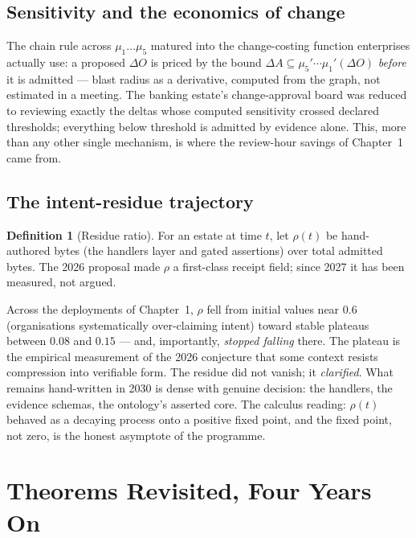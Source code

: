 \documentclass[11pt,a4paper]{report}
\theoremstyle{definition}
\newtheorem{definition}[theorem]{Definition}
\theoremstyle{remark}
\newcommand{\mymu}{\mu}
\newcommand{\del}{\Delta}
\begin{document}
\section{Sensitivity and the economics of change}

The chain rule across $\mymu_1 \dots \mymu_5$ matured into the
change-costing function enterprises actually use: a proposed
$\del O$ is priced by the bound
$\del A \subseteq \mymu_5' \cdots \mymu_1'(\del O)$ \emph{before} it is
admitted --- blast radius as a derivative, computed from the graph, not
estimated in a meeting. The banking estate's change-approval board was
reduced to reviewing exactly the deltas whose computed sensitivity crossed
declared thresholds; everything below threshold is admitted by evidence
alone. This, more than any other single mechanism, is where the review-hour
savings of Chapter~1 came from.

\section{The intent-residue trajectory}

\begin{definition}[Residue ratio]
For an estate at time $t$, let $\rho(t)$ be hand-authored bytes (the
handlers layer and gated assertions) over total admitted bytes. The 2026
proposal made $\rho$ a first-class receipt field; since 2027 it has been
measured, not argued.
\end{definition}

Across the deployments of Chapter~1, $\rho$ fell from initial values near
$0.6$ (organisations systematically over-claiming intent) toward stable
plateaus between $0.08$ and $0.15$ --- and, importantly, \emph{stopped
falling} there. The plateau is the empirical measurement of the 2026
conjecture that some context resists compression into verifiable form.
The residue did not vanish; it \emph{clarified}. What remains hand-written
in 2030 is dense with genuine decision: the handlers, the evidence schemas,
the ontology's asserted core. The calculus reading: $\rho(t)$ behaved as a
decaying process onto a positive fixed point, and the fixed point, not
zero, is the honest asymptote of the programme.

\chapter{Theorems Revisited, Four Years On}
\end{document}
